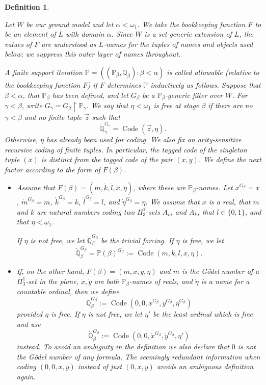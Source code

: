 \documentclass[a4paper,11pt]{article}
\newtheorem{definition}[theorem]{Definition}
\newcommand{\forceP}{\mathbb{P}}
\newcommand{\forceQ}{\mathbb{Q}}
\begin{document}
    \begin{definition}\label{0-allowable forcing}

    Let $W$ be our ground model and let $\alpha<\omega_1$. We take the bookkeeping function $F$ to be an element of $L$ with domain $\alpha$. Since $W$ is a set-generic extension of $L$, the values of $F$ are understood as $L$-names for the tuples of names and objects used below; we suppress this outer layer of names throughout.

    A finite support iteration $\forceP=((\forceP_\beta,\dot{\forceQ}_\beta):\beta<\alpha)$ is called allowable (relative to the bookkeeping function $F$) if $F$ determines $\forceP$ inductively as follows. Suppose that $\beta<\alpha$, that $\forceP_\beta$ has been defined, and let $G_\beta$ be a $\forceP_\beta$-generic filter over $W$. For $\gamma<\beta$, write $G_\gamma=G_\beta\upharpoonright\forceP_\gamma$. We say that $\eta<\omega_1$ is \emph{free at stage $\beta$} if there are no $\gamma<\beta$ and no finite tuple $\vec z$ such that
    \[
    \dot{\forceQ}_\gamma^{G_\gamma}=\operatorname{Code}(\vec z,\eta).
    \]
    Otherwise, $\eta$ has already been used for coding. We also fix an arity-sensitive recursive coding of finite tuples. In particular, the tagged code of the singleton tuple $(x)$ is distinct from the tagged code of the pair $(x,y)$. We define the next factor according to the form of $F(\beta)$.

    \begin{itemize}
    \item[(1)] Assume that $F(\beta)=(\dot m,\dot k,\dot l,\dot x,\dot\eta)$, where these are $\forceP_\beta$-names. Let $\dot x^{G_\beta}=x$, $\dot m^{G_\beta}=m$, $\dot k^{G_\beta}=k$, $\dot l^{G_\beta}=l$, and $\dot\eta^{G_\beta}=\eta$. We assume that $x$ is a real, that $m$ and $k$ are natural numbers coding two $\Pi^1_3$-sets $A_m$ and $A_k$, that $l\in\{0,1\}$, and that $\eta<\omega_1$.

    If $\eta$ is not free, we let $\dot{\forceQ}_\beta^{G_\beta}$ be the trivial forcing. If $\eta$ is free, we let
    \[
    \dot{\forceQ}_\beta^{G_\beta}=\forceP(\beta)^{G_\beta}:=\operatorname{Code}(m,k,l,x,\eta).
    \]

    \item[(2)] If, on the other hand, $F(\beta)=(\dot m,\dot x,\dot y,\dot\eta)$ and $\dot m$ is the G\"odel number of a $\Pi^1_3$-set in the plane, $\dot x,\dot y$ are both $\forceP_\beta$-names of reals, and $\dot\eta$ is a name for a countable ordinal, then we define
    \[
    \dot{\forceQ}_\beta^{G_\beta}:=\operatorname{Code}(0,0,\dot x^{G_\beta},\dot y^{G_\beta},\dot\eta^{G_\beta})
    \]
    provided $\eta$ is free. If $\eta$ is not free, we let $\eta'$ be the least ordinal which is free and use
    \[
    \dot{\forceQ}_\beta^{G_\beta}:=\operatorname{Code}(0,0,\dot x^{G_\beta},\dot y^{G_\beta},\eta')
    \]
    instead. To avoid an ambiguity in the definition we also declare that $0$ is not the G\"odel number of any formula. The seemingly redundant information when coding $(0,0,x,y)$ instead of just $(0,x,y)$ avoids an ambiguous definition again.


\end{itemize}
\end{definition}
\end{document}
